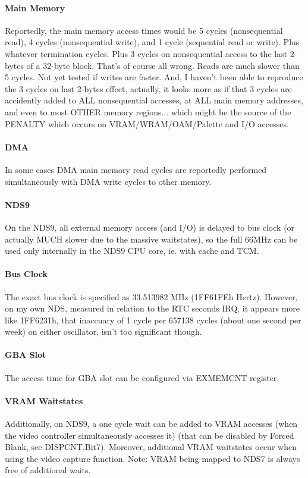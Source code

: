 \documentclass[11pt,a4paper]{proc}
\begin{document}
\begin{flushleft}
\paragraph{Main Memory}
Reportedly, the main memory access times would be 5 cycles (nonsequential read), 4 cycles (nonsequential write), and 1 cycle (sequential read or write). Plus whatever termination cycles. Plus 3 cycles on nonsequential access to the last 2-bytes of a 32-byte block.
That's of course all wrong. Reads are much slower than 5 cycles. Not yet tested if writes are faster. And, I haven't been able to reproduce the 3 cycles on last 2-bytes effect, actually, it looks more as if that 3 cycles are accidently added to ALL nonsequential accesses, at ALL main memory addresses, and even to most OTHER memory regions... which might be the source of the PENALTY which occurs on VRAM/WRAM/OAM/Palette and I/O accesses.

\paragraph{DMA}
In some cases DMA main memory read cycles are reportedly performed simultaneously with DMA write cycles to other memory.

\paragraph{NDS9}
On the NDS9, all external memory access (and I/O) is delayed to bus clock (or actually MUCH slower due to the massive waitstates), so the full 66MHz can be used only internally in the NDS9 CPU core, ie. with cache and TCM.

\paragraph{Bus Clock}
The exact bus clock is specified as 33.513982 MHz (1FF61FEh Hertz). However, on my own NDS, measured in relation to the RTC seconds IRQ, it appears more like 1FF6231h, that inaccuary of 1 cycle per 657138 cycles (about one second per week) on either oscillator, isn't too significant though.

\paragraph{GBA Slot}
The access time for GBA slot can be configured via EXMEMCNT register.

\paragraph{VRAM Waitstates}
Additionally, on NDS9, a one cycle wait can be added to VRAM accesses (when the video controller simultaneously accesses it) (that can be disabled by Forced Blank, see DISPCNT.Bit7). Moreover, additional VRAM waitstates occur when using the video capture function.
Note: VRAM being mapped to NDS7 is always free of additional waits.


\end{flushleft}
\end{document}
